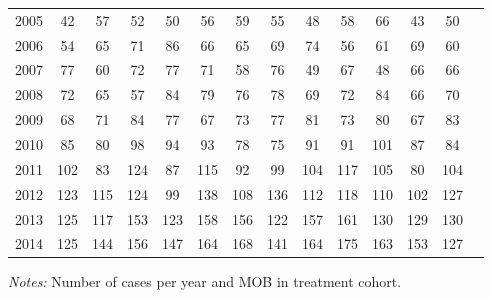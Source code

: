\begin{table}[H]
\begin{threeparttable}
{\begin{tabular}{l*{13}{c}}
2005        &          42&          57&          52&          50&          56&          59&          55&          48&          58&          66&          43&          50\\
2006        &          54&          65&          71&          86&          66&          65&          69&          74&          56&          61&          69&          60\\
2007        &          77&          60&          72&          77&          71&          58&          76&          49&          67&          48&          66&          66\\
2008        &          72&          65&          57&          84&          79&          76&          78&          69&          72&          84&          66&          70\\
2009        &          68&          71&          84&          77&          67&          73&          77&          81&          73&          80&          67&          83\\
2010        &          85&          80&          98&          94&          93&          78&          75&          91&          91&         101&          87&          84\\
2011        &         102&          83&         124&          87&         115&          92&          99&         104&         117&         105&          80&         104\\
2012        &         123&         115&         124&          99&         138&         108&         136&         112&         118&         110&         102&         127\\
2013        &         125&         117&         153&         123&         158&         156&         122&         157&         161&         130&         129&         130\\
2014        &         125&         144&         156&         147&         164&         168&         141&         164&         175&         163&         153&         127\\
 \bottomrule \end{tabular} } \begin{tablenotes} \item \scriptsize \emph{Notes:} Number of cases per year and MOB in treatment cohort. \end{tablenotes} \end{threeparttable} \end{table} 
